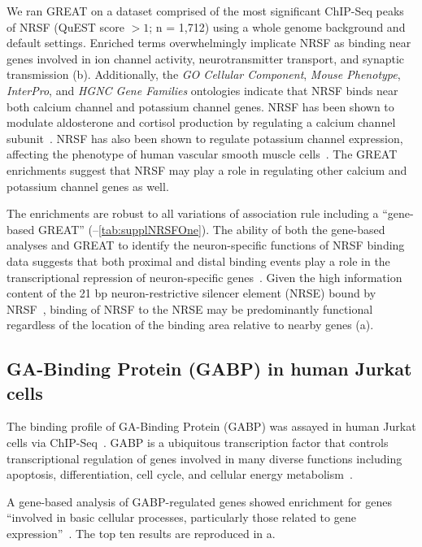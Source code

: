 We ran GREAT on a dataset comprised of the most significant ChIP-Seq peaks of
NRSF (QuEST score $> 1$; n = 1,712) using a whole genome background and
default settings.  Enriched terms overwhelmingly implicate NRSF as binding near genes involved in
ion channel activity, neurotransmitter transport, and synaptic transmission
(b).
Additionally, the \emph{GO Cellular Component}, \emph{Mouse Phenotype}, \emph{InterPro},
and \emph{HGNC Gene Families} ontologies indicate that NRSF
binds near both calcium channel and potassium channel genes.  NRSF has been
shown to modulate aldosterone and cortisol production by regulating a calcium
channel subunit~\citep{Somekawa2009}.  NRSF has also been shown to regulate
potassium channel expression, affecting the phenotype of human vascular
smooth muscle cells~\citep{Cheong2005}.  The GREAT enrichments suggest that
NRSF may play a role in regulating other calcium and potassium channel genes
as well.
%

The enrichments are robust to all variations of association rule including a 
``gene-based GREAT'' (--\ref{tab:supplNRSFOne}).
%
The ability of both the gene-based analyses and GREAT to 
identify the neuron-specific functions of NRSF binding data suggests that both
proximal and distal binding events play a role in the transcriptional repression of
neuron-specific genes~\citep{Chen1998}.  Given the high information
content of the 21 bp neuron-restrictive silencer element (NRSE) bound by
NRSF~\citep{Chong1995, Schoenherr1995}, binding of NRSF to the NRSE
may be predominantly functional regardless of the location of the binding area relative
to nearby genes (a).


\subsection{GA-Binding Protein (GABP) in human Jurkat cells}
The binding profile of GA-Binding Protein (GABP) was assayed in human Jurkat cells
via ChIP-Seq~\citep{Valouev2008}.  GABP is a ubiquitous transcription factor that
controls transcriptional regulation of genes involved in many diverse functions including
apoptosis, differentiation, cell cycle, and cellular energy metabolism~\citep{Rosmarin2004}.

A gene-based analysis of GABP-regulated genes showed enrichment for genes ``involved in
basic cellular processes, particularly those related to gene expression''~\citep{Valouev2008}.
The top ten results are reproduced in a.
%

